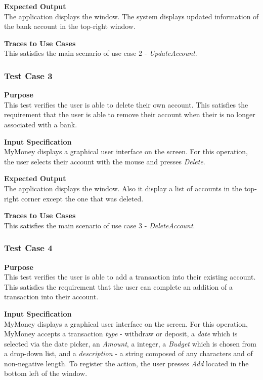 \documentclass[12pt]{article}
\begin{document}
\noindent
{\bf Expected Output}\\
    The application displays the window.    
    The system displays updated information of the bank account in the top-right window.

 \noindent
 {\bf Traces to Use Cases}\\
     This satisfies the main scenario of use case 2 - \textit{UpdateAccount}.
                 
\clearpage %
\subsubsection{Test Case 3} \label{TC-3}
\noindent
{\bf Purpose}\\
 This test verifies the user is able to delete their own account.
 This satisfies the requirement that the user is able to remove their account when their is no longer associated
 with a bank. 

 \noindent
 {\bf Input Specification}\\
 MyMoney displays a graphical user interface on the screen.
 For this operation, the user selects their account with the mouse and presses \textit{Delete}.
                            
 \noindent
 {\bf Expected Output}\\
 The application displays the window.
 Also it display a list of accounts in the top-right corner except the one that was deleted.

\noindent
{\bf Traces to Use Cases}\\
This satisfies the main scenario of use case 3 - \textit{DeleteAccount}.

\subsubsection{Test Case 4} \label{TC-4}

\noindent
{\bf Purpose}\\
This test verifies the user is able to add a transaction into their existing account.
This satisfies the requirement that the user can complete an addition of a transaction into their account.
                                        
\noindent
{\bf Input Specification}\\
MyMoney displays a graphical user interface on the screen.
For this operation, MyMoney accepts a transaction \textit{type} - withdraw or deposit, a \textit{date}
which is selected via the date picker, an \textit{Amount}, a integer, a \textit{Budget} which is chosen
from a drop-down list, and a \textit{description} - a string composed of any characters and
of non-negative length. To register the action, the user presses \textit{Add} located in the bottom left
of the window.                                          
\end{document}

